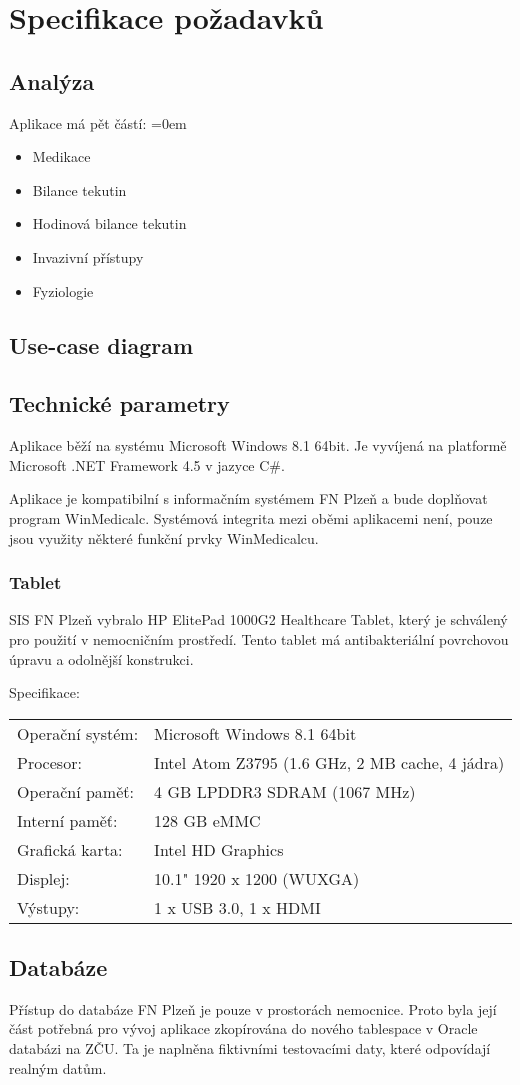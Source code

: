 \chapter{Specifikace požadavků}

\section{Analýza}

Aplikace má pět částí:
\parskip=0em
\begin{itemize}
	\item Medikace
	\item Bilance tekutin
	\item Hodinová bilance tekutin
	\item Invazivní přístupy
	\item Fyziologie
\end{itemize}

\section{Use-case diagram}


\section{Technické parametry}

Aplikace běží na systému Microsoft Windows 8.1 64bit. Je vyvíjená na platformě Microsoft .NET Framework 4.5 v jazyce C\#.

Aplikace je kompatibilní s informačním systémem FN Plzeň a bude doplňovat program WinMedicalc. Systémová integrita mezi oběmi aplikacemi není, pouze jsou využity některé funkční prvky WinMedicalcu.

\subsection{Tablet}

SIS FN Plzeň vybralo HP ElitePad 1000G2 Healthcare Tablet, který je schválený pro použití v nemocničním prostředí. Tento tablet má antibakteriální povrchovou úpravu a odolnější konstrukci.

\noindent
Specifikace:

\noindent
\begin{tabular}{l l}
	Operační systém: & Microsoft Windows 8.1 64bit\\
	Procesor: & Intel Atom Z3795 (1.6 GHz, 2 MB cache, 4 jádra)\\
	Operační paměť: & 4 GB LPDDR3 SDRAM (1067 MHz)\\
	Interní paměť: & 128 GB eMMC\\
	Grafická karta: & Intel HD Graphics\\
	Displej: & 10.1" 1920 x 1200 (WUXGA)\\
	Výstupy: & 1 x USB 3.0, 1 x HDMI
\end{tabular}


\section{Databáze}

Přístup do databáze FN Plzeň je pouze v prostorách nemocnice. Proto byla její část potřebná pro vývoj aplikace zkopírována do nového tablespace v Oracle databázi na ZČU. Ta je naplněna fiktivními testovacími daty, které odpovídají realným datům.